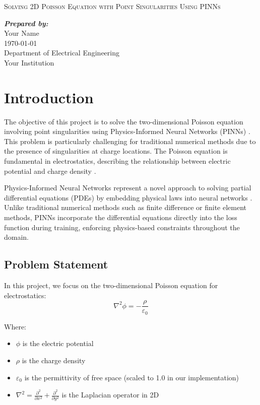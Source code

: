 \documentclass[12pt,a4paper]{report}
\begin{document}
	
	\begin{titlepage}
		\centering
		{\Huge \scshape Solving 2D Poisson Equation with Point Singularities Using PINNs \par}
		\vspace{2cm}
		{\Large \bfseries \itshape Prepared by:\\}
		{\large Your Name\\}
		\vspace{1cm}
		{\large \today\\}
		\vfill
		{\Large Department of Electrical Engineering\\Your Institution}
	\end{titlepage}
	
	\tableofcontents
	\newpage
	
	\chapter{Introduction}
	The objective of this project is to solve the two-dimensional Poisson equation involving point singularities using Physics-Informed Neural Networks (PINNs) \cite{raissi2019physics}. This problem is particularly challenging for traditional numerical methods due to the presence of singularities at charge locations. The Poisson equation is fundamental in electrostatics, describing the relationship between electric potential and charge density \cite{griffiths2017introduction}.
	
	Physics-Informed Neural Networks represent a novel approach to solving partial differential equations (PDEs) by embedding physical laws into neural networks \cite{jagtap2022deep}. Unlike traditional numerical methods such as finite difference or finite element methods, PINNs incorporate the differential equations directly into the loss function during training, enforcing physics-based constraints throughout the domain.
	
	\section{Problem Statement}
	In this project, we focus on the two-dimensional Poisson equation for electrostatics:
	\begin{equation}
		\nabla^2 \phi = -\frac{\rho}{\varepsilon_0}
	\end{equation}
	
	Where:
	\begin{itemize}
		\item $\phi$ is the electric potential
		\item $\rho$ is the charge density
		\item $\varepsilon_0$ is the permittivity of free space (scaled to 1.0 in our implementation)
		\item $\nabla^2 = \frac{\partial^2}{\partial x^2} + \frac{\partial^2}{\partial y^2}$ is the Laplacian operator in 2D
	\end{itemize}
	
\end{document}
